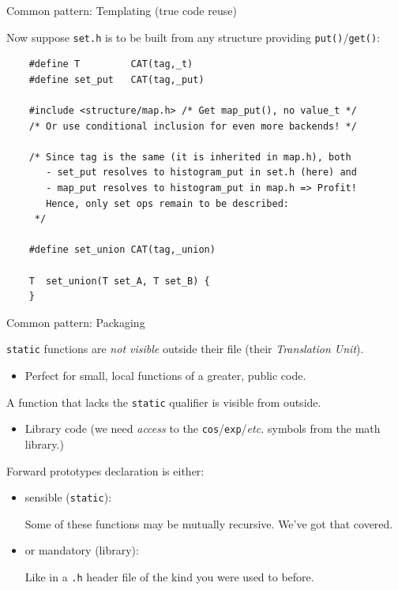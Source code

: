 \begin{frame}[fragile]{Common pattern: Templating (true code reuse)}

  Now suppose \lstinline{set.h} is to be built from any structure providing \lstinline{put()}/\lstinline{get()}:

  \begin{lstlisting}
    #define T         CAT(tag,_t)
    #define set_put   CAT(tag,_put)

    #include <structure/map.h> /* Get map_put(), no value_t */
    /* Or use conditional inclusion for even more backends! */

    /* Since tag is the same (it is inherited in map.h), both
       - set_put resolves to histogram_put in set.h (here) and
       - map_put resolves to histogram_put in map.h => Profit!
       Hence, only set ops remain to be described:       
     */

    #define set_union CAT(tag,_union)
    
    T  set_union(T set_A, T set_B) {
    }
  \end{lstlisting}
  
\end{frame}

\begin{frame}[fragile]{Common pattern: Packaging}

  \lstinline{static} functions are {\em not visible} outside their file (their {\em Translation Unit}).
  \begin{itemize}
  \item Perfect for small, local functions of a greater, public code.
  \end{itemize}

  A function that lacks the \lstinline{static} qualifier is visible from outside.
  \begin{itemize}
  \item Library code (we need {\em access} to the \lstinline{cos}/\lstinline{exp}/{\em etc.} symbols from the math library.)
  \end{itemize}

  Forward prototypes declaration is either:
  \begin{itemize}
  \item sensible (\lstinline{static}):

    Some of these functions may be mutually recursive. We've got that covered.
  \item or mandatory (library):

    Like in a \lstinline{.h} header file of the kind you were used to before.
  \end{itemize}

\end{frame}

